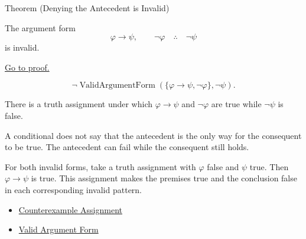 \begin{theorembox}{Theorem (Denying the Antecedent is Invalid)}
\begin{theorem}
\label{thm:denying-antecedent-invalid-propositional-logic}
The argument form
\[
\varphi\to\psi,\qquad \neg\varphi \quad\therefore\quad \neg\psi
\]
is invalid.

\noindent\hyperref[prf:denying-antecedent-invalid-propositional-logic]{Go to proof.}
\end{theorem}
\end{theorembox}

\begin{remark*}
\[
\neg\operatorname{ValidArgumentForm}(\{\varphi\to\psi,\neg\varphi\},\neg\psi).
\]
\end{remark*}

\begin{remark*}
There is a truth assignment under which \(\varphi\to\psi\) and \(\neg\varphi\)
are true while \(\neg\psi\) is false.
\end{remark*}

\begin{remark*}[Interpretation]
A conditional does not say that the antecedent is the only way for the consequent
to be true. The antecedent can fail while the consequent still holds.
\end{remark*}

\begin{remark*}[Exposition]
For both invalid forms, take a truth assignment with \(\varphi\) false and
\(\psi\) true. Then \(\varphi\to\psi\) is true. This assignment makes the
premises true and the conclusion false in each corresponding invalid pattern.
\end{remark*}

\begin{dependencies}
\begin{itemize}
  \item \hyperref[def:counterexample-assignment-propositional-logic]{Counterexample Assignment}
  \item \hyperref[def:valid-argument-form-propositional-logic]{Valid Argument Form}
\end{itemize}
\end{dependencies}
